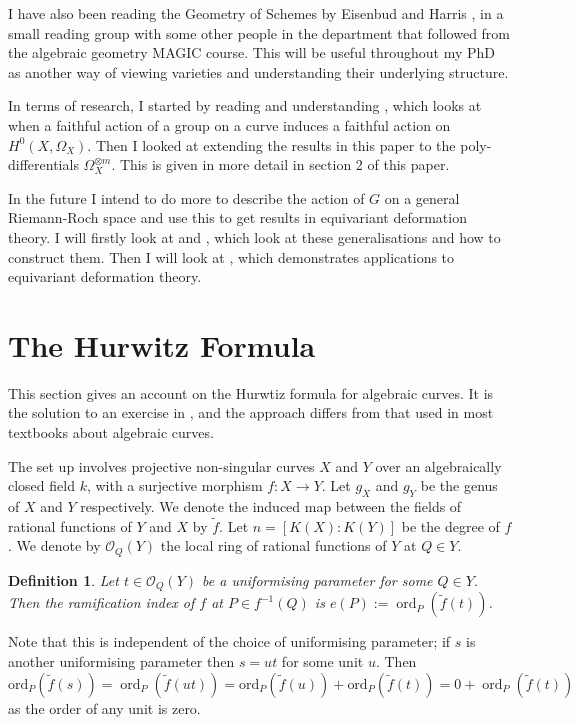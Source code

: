 \documentclass[11pt]{article} %
\newtheorem{defn}{Definition}
\DeclareMathOperator{\ord}{ord}
\begin{document}
I have also been reading the Geometry of Schemes by Eisenbud and Harris \citep{geoschemes}, in a small reading group with some other people in the department that followed from the algebraic geometry MAGIC course. This will be useful throughout my PhD as another way of viewing varieties and understanding their underlying structure.

In terms of research, I started by reading and understanding \citep{faithfulaction}, which looks at when a faithful action of a group on a curve induces a faithful action on $H^0(X,\Omega_X)$. Then I looked at extending the results in this paper to the poly-differentials $\Omega_X^{\otimes m}$. This is given in more detail in section 2 of this paper.

In the future I intend to do more to describe the action of $G$ on a general Riemann-Roch space and use this to get results in equivariant deformation theory. I will firstly look at \citep{cohogsheaves} and \citep{galiosstruc}, which look at these generalisations and how to construct them. Then I will look at \citep{quaddiffequi}, which demonstrates applications to equivariant deformation theory.



\section{The Hurwitz Formula}
This section gives an account on the Hurwtiz formula for algebraic curves. It is the solution to an exercise in \citep{fulton}, and the approach differs from that used in most textbooks about algebraic curves.

The set up involves projective non-singular curves $X$ and $Y$ over an algebraically closed field $k$, with a surjective morphism $f:X\rightarrow Y$. Let $g_X$ and $g_Y$ be the genus of $X$ and $Y$ respectively. We denote the induced map between the fields of rational functions of $Y$ and $X$ by $\tilde{f}$. Let $n=[K(X):K(Y)]$ be the degree of $f$. We denote by $\mathscr{O}_Q(Y)$ the local ring of rational functions of $Y$ at $Q\in Y$.\\


\begin{defn}
	Let $t\in \mathscr{O}_{Q}(Y)$ be a uniformising parameter for some $Q\in Y$. Then the ramification 	index of $f$ at $P\in f^{-1}(Q)$ is $e(P):= \ord_{P}(\tilde{f} (t))$.
\end{defn}

Note that this is independent of the choice of uniformising parameter; if $s$ is another uniformising parameter then $s=ut$ for some unit $u$. Then 
	\[
		\textrm{ord}_{P}(\tilde{f}(s))=\ord_{P}(\tilde{f}(ut))=\textrm{ord}_{P}(\tilde{f}				(u))+\textrm{ord}_{P}(\tilde{f}(t))=0+\ord_{P}(\tilde{f}(t))
	\]
as the order of any unit is zero.
\end{document}
